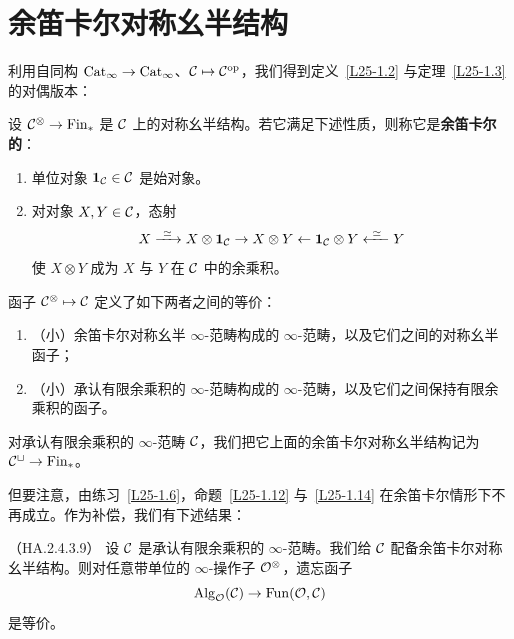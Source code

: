 \section{余笛卡尔对称幺半结构}

\nitem\label{L25-2.1} 利用自同构 $\operatorname{Cat}_{\infty}\to\operatorname{Cat}_{\infty}$、$\mathcal{C}\mapsto\mathcal{C}^{\mathrm{op}}$，我们得到定义~\ref{L25-1.2} 与定理~\ref{L25-1.3} 的对偶版本：

\begin{definition}\label{L25-2.2}
设 $\mathcal{C}^{\otimes}\to\mathrm{Fin}_{*}$ 是 $\mathcal{C}$ 上的对称幺半结构。若它满足下述性质，则称它是\textbf{余笛卡尔的}：
\begin{enumerate}[label=(\arabic*),leftmargin=2.4em,itemsep=0.1em]
\item 单位对象 $\mathbf{1}_{\mathcal{C}}\in\mathcal{C}$ 是始对象。
\item 对对象 $X,Y\in\mathcal{C}$，态射
\[
X\xrightarrow{\ \simeq\ }X\otimes\mathbf{1}_{\cC}\to X\otimes Y\leftarrow\mathbf{1}_{\cC}\otimes Y\xleftarrow{\ \simeq\ }Y
\]
使 $X\otimes Y$ 成为 $X$ 与 $Y$ 在 $\mathcal{C}$ 中的余乘积。
\end{enumerate}
\end{definition}

\begin{corollary}\label{L25-2.3}
函子 $\mathcal{C}^{\otimes}\mapsto\mathcal{C}$ 定义了如下两者之间的等价：
\begin{enumerate}[label=(\roman*),leftmargin=2.4em,itemsep=0.1em]
\item （小）余笛卡尔对称幺半 $\infty$-范畴构成的 $\infty$-范畴，以及它们之间的对称幺半函子；
\item （小）承认有限余乘积的 $\infty$-范畴构成的 $\infty$-范畴，以及它们之间保持有限余乘积的函子。
\end{enumerate}
\end{corollary}

\nitem\label{L25-2.4} 对承认有限余乘积的 $\infty$-范畴 $\mathcal{C}$，我们把它上面的余笛卡尔对称幺半结构记为 $\mathcal{C}^{\sqcup}\to\mathrm{Fin}_{*}$。

\nitem\label{L25-2.5} 但要注意，由练习~\ref{L25-1.6}，命题~\ref{L25-1.12} 与~\ref{L25-1.14} 在余笛卡尔情形下不再成立。作为补偿，我们有下述结果：

\begin{proposition}\label{L25-2.6}（HA.2.4.3.9）
设 $\mathcal{C}$ 是承认有限余乘积的 $\infty$-范畴。我们给 $\mathcal{C}$ 配备余笛卡尔对称幺半结构。则对任意带单位的 $\infty$-操作子 $\mathcal{O}^{\otimes}$，遗忘函子
\[
\operatorname{Alg}_{\mathcal{O}}(\mathcal{C})\to\operatorname{Fun}(\mathcal{O},\mathcal{C})
\]
是等价。
\end{proposition}

